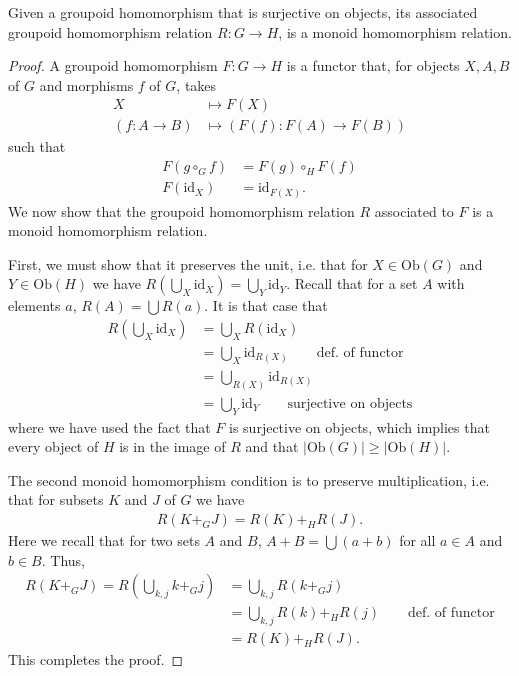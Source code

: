 \begin{lemma}
\label{lem:mongrphom}
Given a groupoid homomorphism that is surjective on objects, its associated groupoid homomorphism relation $R:G\to H$, is a monoid homomorphism relation.
\end{lemma}
\begin{proof}
A groupoid homomorphism $F:G\to H$ is a functor that, for objects $X,A,B$ of $G$ and morphisms $f$ of $G$, takes
\begin{align*}
X &\mapsto F(X) \\
(f:A\to B) &\mapsto \left(F(f):F(A)\to F(B)\right)
\end{align*}
such that
\begin{align*}
F(g\circ_G f) &= F(g)\circ_H F(f) \\
F(\mbox{id}_X) &= \mbox{id}_{F(X)}.
\end{align*}
We now show that the groupoid homomorphism relation $R$ associated to $F$ is a monoid homomorphism relation.

First, we must show that it preserves the unit, i.e. that for $X\in\mbox{Ob}(G)$  and $Y\in\mbox{Ob}(H)$ we have $R(\bigcup_X \mbox{id}_X) = \bigcup_Y \mbox{id}_Y$. Recall that for a set $A$ with elements $a$, $R(A)=\bigcup R(a)$. It is that case that
\begin{align}
R(\bigcup_X \mbox{id}_X) &= \bigcup_XR(\mbox{id}_X) \\
&= \bigcup_X\mbox{id}_{R(X)} \qquad \mbox{def. of functor} \\
&= \bigcup_{R(X)}\mbox{id}_{R(X)} \\
&= \bigcup_{Y}\mbox{id}_{Y} \qquad \mbox{surjective on objects}
\end{align}
where we have used the fact that $F$ is surjective on objects, which implies that every object of $H$ is in the image of $R$ and that $|\mbox{Ob}(G)|\ge|\mbox{Ob}(H)|$.

The second monoid homomorphism condition is to preserve multiplication, i.e. that for subsets $K$ and $J$ of $G$ we have
\begin{align}
R(K+_GJ)=R(K)+_HR(J).
\end{align}
Here we recall that for two sets $A$ and $B$, $A+B=\bigcup(a+b)$ for all $a\in A$ and $b\in B$. Thus,
\begin{align}
R(K+_GJ) = R(\bigcup_{k,j}k+_Gj) &= \bigcup_{k,j}R(k+_Gj) \\
&= \bigcup_{k,j}R(k)+_HR(j) \qquad \mbox{def. of functor}\\
&= R(K)+_HR(J).
\end{align}
This completes the proof.
\end{proof}

